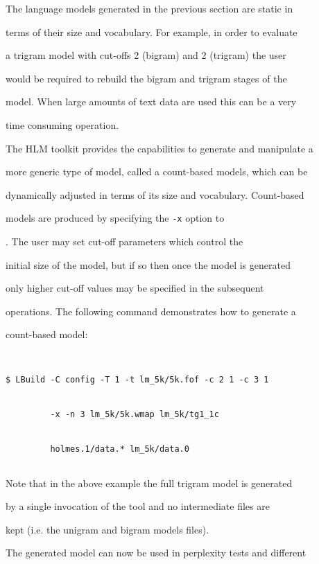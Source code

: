 The language models generated in the previous section are static in


terms of their size and vocabulary. For example, in order to evaluate


a trigram model with cut-offs 2 (bigram) and 2 (trigram) the user


would be required to rebuild the bigram and trigram stages of the


model.  When large amounts of text data are used this can be a very


time consuming operation.





The HLM toolkit provides the capabilities to generate and manipulate a


more generic type of model, called a count-based models, which can be


dynamically adjusted in terms of its size and vocabulary.  Count-based


models are produced by specifying the \texttt{-x} option to


.  The user may set cut-off parameters which control the


initial size of the model, but if so then once the model is generated


only higher cut-off values may be specified in the subsequent


operations.  The following command demonstrates how to generate a


count-based model:


\begin{verbatim}


$ LBuild -C config -T 1 -t lm_5k/5k.fof -c 2 1 -c 3 1 


         -x -n 3 lm_5k/5k.wmap lm_5k/tg1_1c 


         holmes.1/data.* lm_5k/data.0


\end{verbatim} %


Note that in the above example the full trigram model is generated


by a single invocation of the tool and no intermediate files are


kept (i.e. the unigram and bigram models files).  





The generated model can now be used in perplexity tests and different


